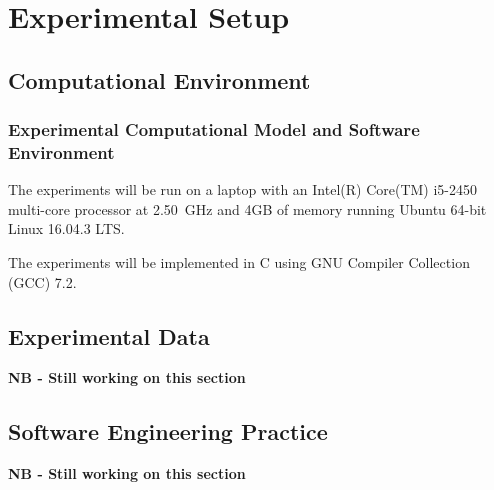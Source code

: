 %
%
%
%   
%
%
\chapter{Experimental Setup} \label{chap:experimentalsetup}
\vspace{-1cm}

\vspace{-1cm}
\section{Computational Environment}

\subsection{Experimental Computational Model and Software Environment}
The experiments will be run on a laptop with an Intel(R) Core(TM) i5-2450 multi-core processor at 2.50~GHz and 4GB of memory running Ubuntu 64-bit Linux 16.04.3 LTS.

The experiments will be implemented in C using GNU Compiler Collection (GCC) 7.2.

\section{Experimental Data}

\textbf{NB - Still working on this section}

\section{Software Engineering Practice}

\textbf{NB - Still working on this section}